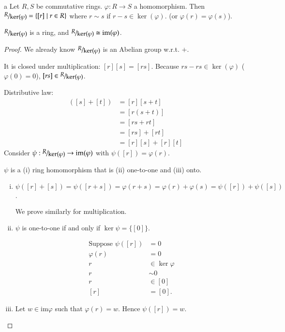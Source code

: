 \begin{defn}{a}
	Let $R,S$ be commutative rings. $\varphi: R\to S$ a homomorphism. Then $\nicefrac{R}{\ker(\varphi)}=\{[r]\mid r\in R\}$ where $r\sim s$ if $r-s\in\ker(\varphi)$. (or $\varphi(r) = \varphi(s)$). 
\end{defn}
\begin{theorem}
	$\nicefrac{R}{\ker(\varphi)}$ is a ring, and $\nicefrac{R}{\ker(\varphi)}\cong \mathrm{im}(\varphi)$. 
\end{theorem}
\begin{proof}
	We already know $\nicefrac{R}{\ker(\varphi)}$ is an Abelian group w.r.t. $+$. 
	
	It is closed under multiplication: $[r][s] = [rs]$. Because $rs-rs\in \ker(\varphi)$ ($\varphi(0) = 0$), $[rs]\in \nicefrac{R}{\ker(\varphi)}$. 
	
	Distributive law: 
	\begin{align*}
		[r]([s] + [t]) &= [r][s+t] \\
		&= [r(s+t)] \\
		&= [rs + rt] \\
		&= [rs] + [rt] \\
		&= [r][s] + [r][t]
	\end{align*}
Consider $\psi: \nicefrac{R}{\ker(\varphi)}\to \mathrm{im}(\varphi)$ with $\psi([r]) = \varphi(r)$. 

$\psi$ is a (i) ring homomorphism that is (ii) one-to-one and (iii) onto. 
\begin{enumerate}[(i)]
	\item $\psi([r]+[s]) = \psi([r+s]) = \varphi(r+s) = \varphi(r) + \varphi(s) = \psi([r]) + \psi([s])$. 
	
	We prove similarly for multiplication. 
	\item $\psi$ is one-to-one if and only if $\ker\psi = \{[0]\}$. 
	
	\begin{align*}
	\text{Suppose }\psi([r]) &= 0 \\
	\varphi(r) &= 0 \\
	r&\in \ker\varphi \\
	r&\sim 0 \\
	r&\in [0] \\
	[r] &= [0].
	\end{align*}
	
	\item Let $w\in \mathrm{im}\varphi$ such that $\varphi(r) = w$. Hence $\psi([r])=w$. 
\end{enumerate}
\end{proof}

